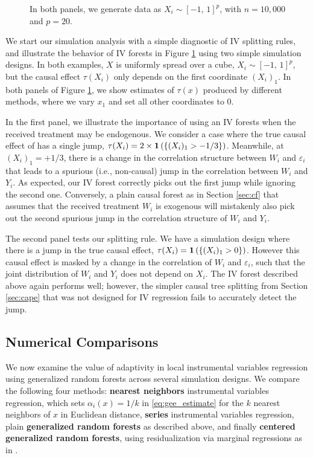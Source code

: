 \documentclass[aos]{imsart}
\theoremstyle{plain}
\theoremstyle{definition}
\theoremstyle{remark}
\begin{document}
\begin{CJK}{UTF8}{gbsn}
{\begin{appendix}
\begin{figure}
\begin{tabular}{cc}
\end{tabular}
\caption{In both panels, we generate data as $X_i \sim [-1, \, 1]^p$, with $n = 10,000$ and $p = 20$.}
\label{fig:iv_simu}
\end{figure}

We start our simulation analysis with a simple diagnostic of IV splitting rules, and
illustrate the behavior of IV forests in Figure \ref{fig:iv_simu} using two simple simulation designs.
In both examples, $X$ is uniformly spread over a cube, $X_i \sim [-1, \, 1]^p$, but the causal effect
$\tau(X_i)$ only depends on the first coordinate $(X_i)_1$. In both panels of Figure \ref{fig:iv_simu},
we show estimates of $\tau(x)$ produced by different methods, where we vary $x_1$ and set all
other coordinates to 0.

In the first panel, we illustrate the importance of using an IV forests when the received treatment
may be endogenous. We consider a case where the true causal effect of has a single jump,
$\tau(X_i) = 2 \times \mathbf{1}\left(\left\{(X_i)_1 > -1/3\right\}\right)$. Meanwhile, at $(X_i)_1 = +1/3$, there is a change
in the correlation structure between $W_i$ and $\varepsilon_i$ that leads to a spurious
(i.e., non-causal) jump in the correlation between $W_i$ and $Y_i$. As expected, our IV forest
correctly picks out the first jump while ignoring the second one. Conversely, a plain causal forest
as in Section \ref{sec:cf} that assumes that the received treatment $W_i$ is
exogenous will mistakenly also pick out the second spurious jump in the correlation structure
of $W_i$ and $Y_i$.

The second panel tests our splitting rule. We have a simulation design where there
is a jump in the true causal effect, $\tau(X_i) = \mathbf{1}\left(\left\{(X_i)_1 > 0\right\}\right)$. However this causal effect is
masked by a change in the correlation of $W_i$ and $\varepsilon_i$, such that the joint distribution
of $W_i$ and $Y_i$ does not depend on $X_i$. The IV forest described above
again performs well; however, the simpler causal tree splitting from
Section \ref{sec:cape} that was not designed for IV regression
fails to accurately detect the jump.

\subsection{Numerical Comparisons}
\label{sec:bigsimu}

We now examine the value of adaptivity in local instrumental variables regression using generalized random forests
across several simulation designs. We compare the following four methods:
{\bf nearest neighbors} instrumental variables regression, which sets $\alpha_i(x) = 1/k$ in
\eqref{eq:gee_estimate} for the $k$ nearest neighbors of $x$ in Euclidean distance,
{\bf series} instrumental variables regression, 
plain {\bf generalized random forests} as described above, and finally
{\bf centered generalized random forests}, using residualization via marginal regressions as in \citet{robinson1988root}.


\end{appendix}}
\end{CJK}
\end{document}
